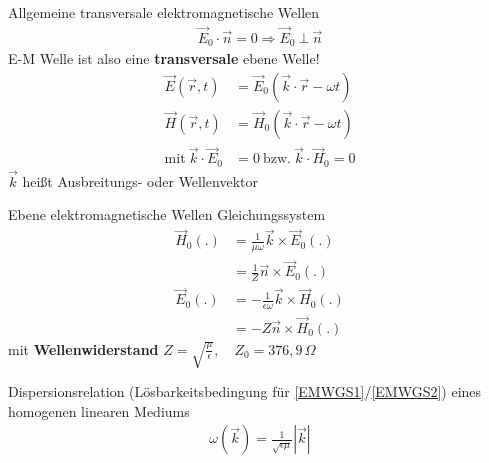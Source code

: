 \documentclass[a6paper]{kartei}
\begin{document}

\begin{karte}{Allgemeine transversale elektromagnetische Wellen}
\begin{eqnarray}
\vec{E}_{0} \cdot \vec{n} = 0 \Rightarrow \vec{E}_{0} \ \bot \ \vec{n}
\end{eqnarray}
E-M Welle ist also eine \textbf{transversale} ebene Welle!
\begin{align}
\vec{E}(\vec{r},t) & = \vec{E}_{0}(\vec{k} \cdot \vec{r} - \omega t) \\
\vec{H}(\vec{r},t) & = \vec{H}_{0}(\vec{k} \cdot \vec{r} - \omega t) \\
\text{mit} \ \vec{k} \cdot \vec{E}_{0} &=  0 \ \text{bzw.}  \ \vec{k} \cdot \vec{H}_{0} =  0 \nonumber
\end{align}
$\vec{k}$ heißt Ausbreitungs- oder Wellenvektor
\end{karte}

\begin{karte}{Ebene elektromagnetische Wellen}
Gleichungssystem
\begin{align}
\vec{H}_{0}(.) & = \frac{1}{\mu \omega} \vec{k} \times \vec{E}_{0}(.) \label{EMWGS1} \\
		 & = \frac{1}{Z} \vec{n} \times \vec{E}_{0}(.) \nonumber \\
\vec{E}_{0}(.) & = - \frac{1}{\epsilon \omega} \vec{k} \times \vec{H}_{0}(.) \label{EMWGS2} \\
		 & = - Z \vec{n} \times \vec{H}_{0}(.) \nonumber
\end{align}
mit \textbf{Wellenwiderstand} $Z = \sqrt{\frac{\mu}{\epsilon}}, \quad Z_{0} = 376,9 \, \Omega$
\end{karte}

\begin{karte}{Dispersionsrelation (Lösbarkeitsbedingung für \eqref{EMWGS1}/\eqref{EMWGS2}) eines homogenen linearen Mediums}
\begin{align}
\omega(\vec{k}) = \frac{1}{\sqrt{\epsilon \mu}}|\vec{k}|
\end{align}
\end{karte}

\end{document}
